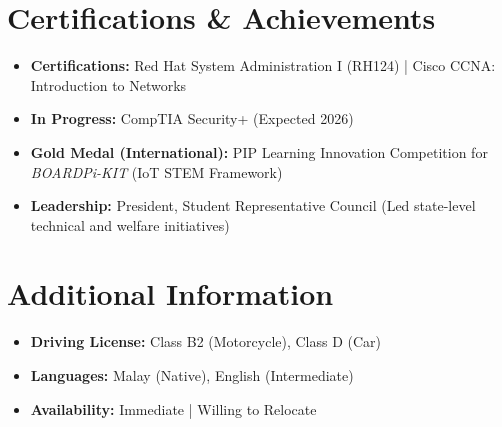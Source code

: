 \documentclass[a4paper,10pt]{article}
\begin{document}
\section*{Certifications \& Achievements}
\begin{itemize}[leftmargin=0.15in, label={}]
    \item \textbf{Certifications:} Red Hat System Administration I (RH124) | Cisco CCNA: Introduction to Networks
    \item \textbf{In Progress:} CompTIA Security+ (Expected 2026)
    \item \textbf{Gold Medal (International):} PIP Learning Innovation Competition for \textit{BOARDPi-KIT} (IoT STEM Framework)
    \item \textbf{Leadership:} President, Student Representative Council (Led state-level technical and welfare initiatives)
\end{itemize}

\section*{Additional Information}
\begin{itemize}[leftmargin=0.15in, label={}]
    \item \textbf{Driving License:} Class B2 (Motorcycle), Class D (Car)
    \item \textbf{Languages:} Malay (Native), English (Intermediate)
    \item \textbf{Availability:} Immediate | Willing to Relocate
\end{itemize}
\end{document}
